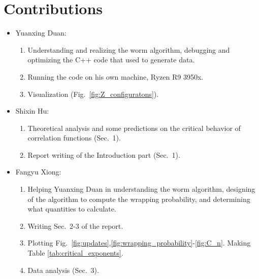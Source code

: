 \documentclass{article}
\theoremstyle{plain} \newtheorem{thm}{Theorem}[section]
\theoremstyle{definition} \newtheorem{df}{Definition}[section]
\theoremstyle{definition} \newtheorem{eg}{Example}
\theoremstyle{remark} \newtheorem*{rmk}{Remark}
\begin{document}
\section*{Contributions}
\begin{itemize}
  \item Yuanxing Duan: 
		\begin{enumerate}
		  \item Understanding and realizing the worm algorithm, debugging and optimizing the C++ code that used to generate data.
			\item Running the code on his own machine, Ryzen R9 3950x.
			\item Visualization (Fig.~\ref{fig:Z_configuratons}).
		\end{enumerate}
	\item Shixin Hu:
		\begin{enumerate}
			\item Theoretical analysis and some predictions on the critical behavior of correlation functions (Sec.~1).
			\item Report writing of the Introduction part (Sec.~1).
		\end{enumerate}
	\item Fangyu Xiong:
		\begin{enumerate}
		  \item Helping Yuanxing Duan in understanding the worm algorithm, designing of the algorithm to compute the wrapping probability, and determining what quantities to calculate.
			\item Writing Sec.~2-3 of the report.
			\item Plotting Fig.~\ref{fig:updates},\ref{fig:wrapping_probability}-\ref{fig:C_n}. Making Table \ref{tab:critical_exponents}.
			\item Data analysis (Sec.~3).
		\end{enumerate}
\end{itemize}
\end{document}
